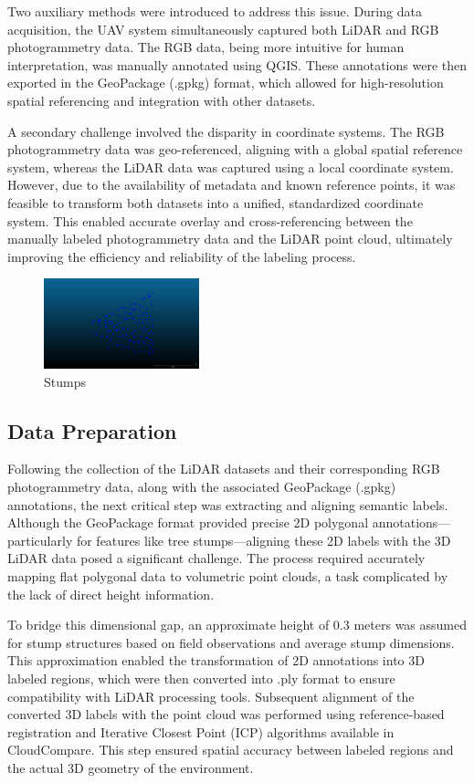 \documentclass[../report.tex]{subfiles}
\begin{document}
    Two auxiliary methods were introduced to address this issue. During data acquisition, the UAV system simultaneously captured both LiDAR and RGB photogrammetry data. The RGB data, being more intuitive for human interpretation, was manually annotated using QGIS. These annotations were then exported in the GeoPackage (.gpkg) format, which allowed for high-resolution spatial referencing and integration with other datasets.\cite{gdal2025gpkg}
    
    A secondary challenge involved the disparity in coordinate systems. The RGB photogrammetry data was geo-referenced, aligning with a global spatial reference system, whereas the LiDAR data was captured using a local coordinate system. However, due to the availability of metadata and known reference points, it was feasible to transform both datasets into a unified, standardized coordinate system. This enabled accurate overlay and cross-referencing between the manually labeled photogrammetry data and the LiDAR point cloud, ultimately improving the efficiency and reliability of the labeling process.
    \begin{figure}[H]
        \centering
        \includegraphics[width=0.4\textwidth]{rnd-project-report-main/figures/Stumps_matched.png}
        \caption{Stumps}
        \label{fig:stumps}
    \end{figure}
    
	\subsection{Data Preparation}
    Following the collection of the LiDAR datasets and their corresponding RGB photogrammetry data, along with the associated GeoPackage (.gpkg) annotations, the next critical step was extracting and aligning semantic labels. Although the GeoPackage format provided precise 2D polygonal annotations—particularly for features like tree stumps—aligning these 2D labels with the 3D LiDAR data posed a significant challenge. The process required accurately mapping flat polygonal data to volumetric point clouds, a task complicated by the lack of direct height information.

    To bridge this dimensional gap, an approximate height of 0.3 meters was assumed for stump structures based on field observations and average stump dimensions. This approximation enabled the transformation of 2D annotations into 3D labeled regions, which were then converted into .ply format to ensure compatibility with LiDAR processing tools. Subsequent alignment of the converted 3D labels with the point cloud was performed using reference-based registration and Iterative Closest Point (ICP) algorithms available in CloudCompare. This step ensured spatial accuracy between labeled regions and the actual 3D geometry of the environment.
    
\end{document}
